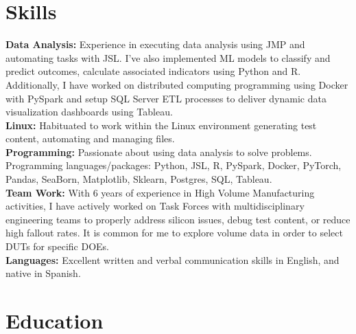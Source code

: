 \documentclass{article}
\begin{document}
\section{Skills}
\noindent\textbf{Data Analysis:} Experience in executing data analysis using JMP and automating tasks with JSL. I’ve also implemented ML models to classify and predict outcomes, calculate associated indicators using Python and R. Additionally, I have worked on distributed computing programming using Docker with PySpark and setup SQL Server ETL processes to deliver dynamic data visualization dashboards using Tableau.\\
\textbf{Linux:} Habituated to work within the Linux environment generating test content, automating and managing files.\\
\textbf{Programming:} Passionate about using data analysis to solve problems. Programming languages/packages: Python, JSL, R, PySpark, Docker, PyTorch, Pandas, SeaBorn, Matplotlib, Sklearn, Postgres, SQL, Tableau.\\
\textbf{Team Work:} With 6 years of experience in High Volume Manufacturing activities, I have actively worked on Task Forces with multidisciplinary engineering teams to properly address silicon issues, debug test content, or reduce high fallout rates. It is common for me to explore volume data in order to select DUTs for specific DOEs.\\
\textbf{Languages:} Excellent written and verbal communication skills in English, and native in Spanish.

\section{Education}
\end{document}
